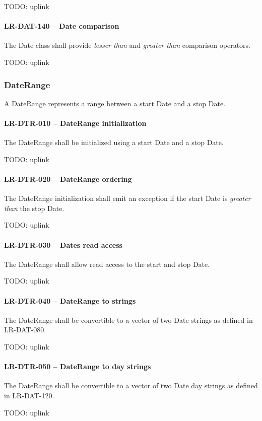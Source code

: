 TODO: uplink

\paragraph{LR-DAT-140 -- Date comparison}
The Date class shall provide \emph{lesser than} and \emph{greater than}
comparison operators.

TODO: uplink

\subsubsection{DateRange}
A DateRange represents a range between a start Date and a stop Date.

\paragraph{LR-DTR-010 -- DateRange initialization}
The DateRange shall be initialized using a start Date and a stop Date.

TODO: uplink

\paragraph{LR-DTR-020 -- DateRange ordering}
The DateRange initialization shall emit an exception if the
start Date is \emph{greater than} the stop Date.

TODO: uplink

\paragraph{LR-DTR-030 -- Dates read access}
The DateRange shall allow read access to the start and stop Date.

TODO: uplink
\paragraph{LR-DTR-040 -- DateRange to strings}
The DateRange shall be convertible to a vector of two Date strings
as defined in LR-DAT-080.

TODO: uplink
\paragraph{LR-DTR-050 -- DateRange to day strings}
The DateRange shall be convertible to a vector of two Date day strings
as defined in LR-DAT-120.

TODO: uplink

